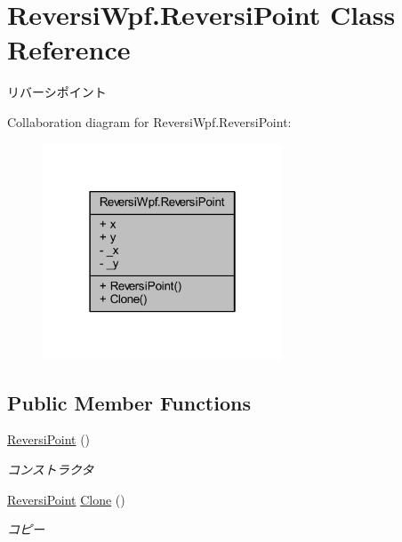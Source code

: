 \hypertarget{class_reversi_wpf_1_1_reversi_point}{}\section{Reversi\+Wpf.\+Reversi\+Point Class Reference}
\label{class_reversi_wpf_1_1_reversi_point}


リバーシポイント  




Collaboration diagram for Reversi\+Wpf.\+Reversi\+Point\+:
\nopagebreak
\begin{figure}[H]
\begin{center}
\leavevmode
\includegraphics[width=202pt]{class_reversi_wpf_1_1_reversi_point__coll__graph}
\end{center}
\end{figure}
\subsection*{Public Member Functions}
\begin{DoxyCompactItemize}
\item 
\hyperlink{class_reversi_wpf_1_1_reversi_point_ae49762ebfdde4cf38173f7e2d97caf56}{Reversi\+Point} ()
\begin{DoxyCompactList}\small\item\em コンストラクタ \end{DoxyCompactList}\item 
\hyperlink{class_reversi_wpf_1_1_reversi_point}{Reversi\+Point} \hyperlink{class_reversi_wpf_1_1_reversi_point_abced863ae8c3a9d22d813e290c0340b0}{Clone} ()
\begin{DoxyCompactList}\small\item\em コピー \end{DoxyCompactList}\end{DoxyCompactItemize}

